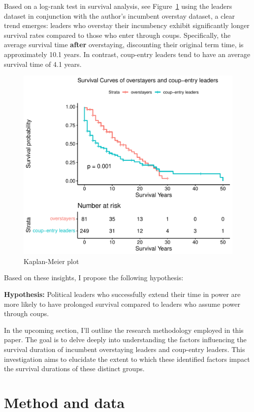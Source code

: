 \documentclass[
  12pt,
  a4paper,
  12pt]{article}
\begin{document}
Based on a log-rank test in survival analysis, see
Figure~\ref{fig-logrank} using the leaders dataset \citep{goemans2009}
in conjunction with the author's incumbent overstay dataset, a clear
trend emerges: leaders who overstay their incumbency exhibit
significantly longer survival rates compared to those who enter through
coups. Specifically, the average survival time \textbf{after}
overstaying, discounting their original term time, is approximately 10.1
years. In contrast, coup-entry leaders tend to have an average survival
time of 4.1 years.

\begin{figure}

{\centering \includegraphics{survival_after_coups_jasa_files/figure-pdf/fig-logrank-1.pdf}

}

\caption{\label{fig-logrank}Kaplan-Meier plot}

\end{figure}

Based on these insights, I propose the following hypothesis:

\textbf{Hypothesis:} Political leaders who successfully extend their
time in power are more likely to have prolonged survival compared to
leaders who assume power through coups.

In the upcoming section, I'll outline the research methodology employed
in this paper. The goal is to delve deeply into understanding the
factors influencing the survival duration of incumbent overstaying
leaders and coup-entry leaders. This investigation aims to elucidate the
extent to which these identified factors impact the survival durations
of these distinct groups.

\hypertarget{method-and-data}{%
\section{Method and data}\label{method-and-data}}

\newpage


\renewcommand\refname{References}
  
\end{document}

